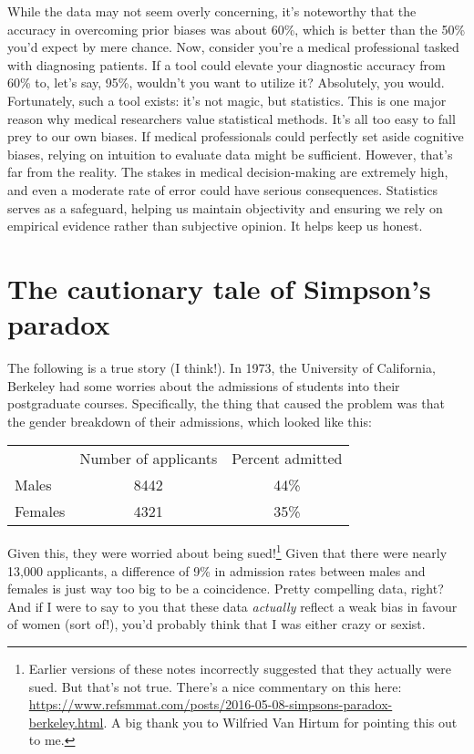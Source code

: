 While the data may not seem overly concerning, it's noteworthy that the accuracy in overcoming prior biases was about 60\%, which is better than the 50\% you'd expect by mere chance. Now, consider you're a medical professional tasked with diagnosing patients. If a tool could elevate your diagnostic accuracy from 60\% to, let's say, 95\%, wouldn't you want to utilize it? Absolutely, you would. Fortunately, such a tool exists: it's not magic, but statistics. This is one major reason why medical researchers value statistical methods. It's all too easy to fall prey to our own biases. If medical professionals could perfectly set aside cognitive biases, relying on intuition to evaluate data might be sufficient. However, that's far from the reality. The stakes in medical decision-making are extremely high, and even a moderate rate of error could have serious consequences. Statistics serves as a safeguard, helping us maintain objectivity and ensuring we rely on empirical evidence rather than subjective opinion. It helps keep us honest.

\section{The cautionary tale of Simpson's paradox}



The following is a true story (I think!). In 1973, the University of California, Berkeley had some worries about the admissions of students into their postgraduate courses. Specifically, the thing that caused the problem was that the gender breakdown of their admissions, which looked like this:
\begin{center}
\begin{tabular}{lcc}
& Number of applicants & Percent admitted \\
Males & 8442 & 44\% \\
Females & 4321 & 35\%  \\
\end{tabular}
\end{center}
Given this, they were worried about being sued!\footnote{Earlier versions of these notes incorrectly suggested that they actually were sued. But that's not true. There's a nice commentary on this here: \url{https://www.refsmmat.com/posts/2016-05-08-simpsons-paradox-berkeley.html}. A big thank you to Wilfried Van Hirtum for pointing this out to me.} Given that there were nearly 13,000 applicants, a difference of 9\% in admission rates between males and females is just way too big to be a coincidence. Pretty compelling data, right? And if I were to say to you that these data {\it actually} reflect a weak bias in favour of women (sort of!), you'd probably think that I was either crazy or sexist. 

